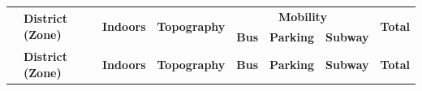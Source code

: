 \documentclass[12pt]{article}
\begin{document}
\footnotesize
\begin{longtable}[c]{c|lccccc|c}
\hline
\multicolumn{1}{c}{}    %
& \multirow{2}{*}{\textbf{District (Zone)}}
& \multirow{2}{*}{\textbf{Indoors}}
& \multirow{2}{*}{\textbf{Topography}}
& \multicolumn{3}{|c|}{\textbf{Mobility}}
& \multirow{2}{*}{\textbf{Total}}
\\
\cline{5-7}
\multicolumn{1}{c}{}    %
&  &  &  & \multicolumn{1}{|c}{\textbf{Bus}} & \textbf{Parking} & \textbf{Subway} & \\
\hline
\endfirsthead

\multicolumn{1}{c}{\textbf{}} & \textbf{District (Zone)} & \textbf{Indoors} & \textbf{Topography} & \textbf{Bus} & \textbf{Parking} & \multicolumn{1}{c}{\textbf{Subway}} & \textbf{Total} \\
\hline
\endhead


\end{longtable}
\end{document}
